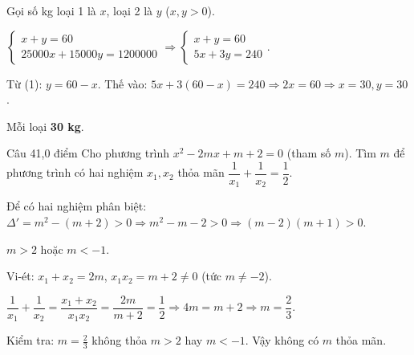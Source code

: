 \begin{loi_giai_cau}
Gọi số kg loại 1 là $x$, loại 2 là $y$ ($x,y>0$).

$\begin{cases}x+y=60\\25000x+15000y=1200000\end{cases}\Rightarrow\begin{cases}x+y=60\\5x+3y=240\end{cases}$.

Từ (1): $y=60-x$. Thế vào: $5x+3(60-x)=240\Rightarrow 2x=60\Rightarrow x=30, y=30$.

Mỗi loại \textbf{30 kg}.
\end{loi_giai_cau}

\begin{de_cau}{Câu 4}{1,0 điểm}
Cho phương trình $x^2-2mx+m+2=0$ (tham số $m$). Tìm $m$ để phương trình có hai nghiệm $x_1,x_2$
thỏa mãn $\dfrac{1}{x_1}+\dfrac{1}{x_2}=\dfrac{1}{2}$.
\end{de_cau}

\begin{loi_giai_cau}
Để có hai nghiệm phân biệt: $\Delta'=m^2-(m+2)>0\Rightarrow m^2-m-2>0\Rightarrow(m-2)(m+1)>0$.

$m>2$ hoặc $m<-1$.

Vi-ét: $x_1+x_2=2m$, $x_1x_2=m+2\neq 0$ (tức $m\neq -2$).

$\dfrac{1}{x_1}+\dfrac{1}{x_2}=\dfrac{x_1+x_2}{x_1x_2}=\dfrac{2m}{m+2}=\dfrac{1}{2}\Rightarrow 4m=m+2\Rightarrow m=\dfrac{2}{3}$.

Kiểm tra: $m=\frac{2}{3}$ không thỏa $m>2$ hay $m<-1$. Vậy không có $m$ thỏa mãn.
\end{loi_giai_cau}
